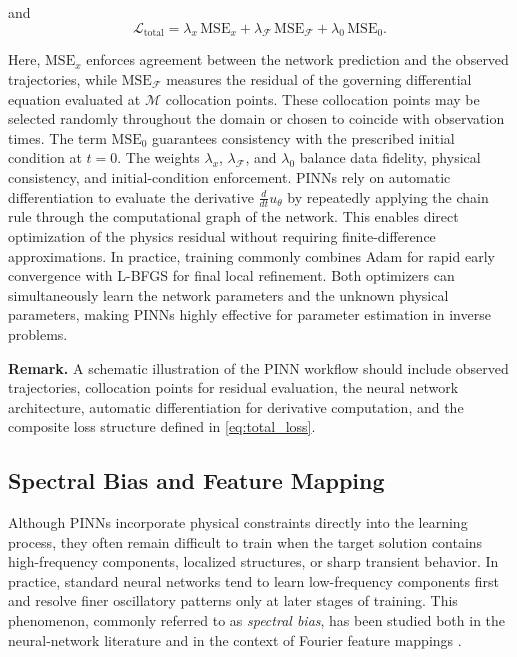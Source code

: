 \documentclass[11pt]{article}
\begin{document}
and
\begin{equation}
\mathcal{L}_{\mathrm{total}}
=
\lambda_x\,\mathrm{MSE}_{x}
+
\lambda_{\mathscr{F}}\,\mathrm{MSE}_{\mathscr{F}}
+
\lambda_0\,\mathrm{MSE}_{0}.
\label{eq:total_loss}
\end{equation}

Here, \(\mathrm{MSE}_{x}\) enforces agreement between the network prediction and the observed trajectories, while \(\mathrm{MSE}_{\mathscr{F}}\) measures the residual of the governing differential equation evaluated at \(\mathscr{M}\) collocation points. These collocation points may be selected randomly throughout the domain or chosen to coincide with observation times. The term \(\mathrm{MSE}_{0}\) guarantees consistency with the prescribed initial condition at \(t=0\). The weights \(\lambda_x\), \(\lambda_{\mathscr{F}}\), and \(\lambda_0\) balance data fidelity, physical consistency, and initial-condition enforcement. PINNs rely on automatic differentiation to evaluate the derivative \(\frac{d}{dt}u_{\theta}\) by repeatedly applying the chain rule through the computational graph of the network. This enables direct optimization of the physics residual without requiring finite-difference approximations. In practice, training commonly combines Adam for rapid early convergence with L-BFGS for final local refinement. Both optimizers can simultaneously learn the network parameters and the unknown physical parameters, making PINNs highly effective for parameter estimation in inverse problems.

\medskip
\noindent\textbf{Remark.}
A schematic illustration of the PINN workflow should include observed trajectories, collocation points for residual evaluation, the neural network architecture, automatic differentiation for derivative computation, and the composite loss structure defined in \eqref{eq:total_loss}.



\subsection{Spectral Bias and Feature Mapping}

Although PINNs incorporate physical constraints directly into the learning process, they often remain difficult to train when the target solution contains high-frequency components, localized structures, or sharp transient behavior. In practice, standard neural networks tend to learn low-frequency components first and resolve finer oscillatory patterns only at later stages of training. This phenomenon, commonly referred to as \emph{spectral bias}, has been studied both in the neural-network literature and in the context of Fourier feature mappings \cite{rahaman2019spectral,tancik2020fourier,ding2025physicsinformedneuralnetworksfourier}.
\end{document}
